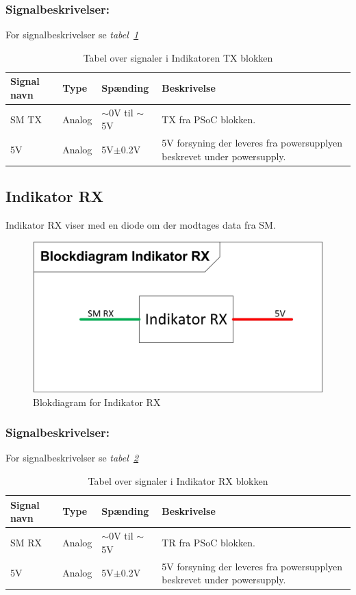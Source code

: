 \subsubsection{Signalbeskrivelser:}
For signalbeskrivelser se \textit{tabel~\ref{table:Indikator_TX}}
\begin{table}[H]
\begin{tabular}{|p{3cm}|p{3cm}|p{3cm}|p{4.5cm}|} \hline
\cellcolor[gray]{0.85}Signal navn& \cellcolor[gray]{0.85}Type &\cellcolor[gray]{0.85}Spænding&\cellcolor[gray]{0.85}Beskrivelse\\ \hline
SM TX & Analog & $\sim$0V til $\sim$5V & TX fra PSoC blokken.\\ \hline
5V & Analog & 5V$\pm$0.2V & 5V forsyning der leveres fra powersupplyen beskrevet under powersupply. \\ \hline
\end{tabular}
\caption{Tabel over signaler i Indikatoren TX blokken}
\label{table:Indikator_TX}
\end{table}
\newpage
\subsection{Indikator RX}
Indikator RX viser med en diode om der modtages data fra SM.
\begin{figure}[H]
\centering
\includegraphics[scale=1]{billeder/Indikator_RXblok}
\caption{Blokdiagram for Indikator RX}
\label{fig:Indikator_RX}
\end{figure}
\subsubsection{Signalbeskrivelser:}
For signalbeskrivelser se \textit{tabel~\ref{table:Indikator_RX}}
\begin{table}[H]
\begin{tabular}{|p{3cm}|p{3cm}|p{3cm}|p{4.5cm}|} \hline
\cellcolor[gray]{0.85}Signal navn& \cellcolor[gray]{0.85}Type &\cellcolor[gray]{0.85}Spænding&\cellcolor[gray]{0.85}Beskrivelse\\ \hline
SM RX & Analog & $\sim$0V til $\sim$5V & TR fra PSoC blokken.\\ \hline
5V & Analog & 5V$\pm$0.2V & 5V forsyning der leveres fra powersupplyen beskrevet under powersupply. \\ \hline
\end{tabular}
\caption{Tabel over signaler i Indikator RX blokken}
\label{table:Indikator_RX}
\end{table}
\newpage
